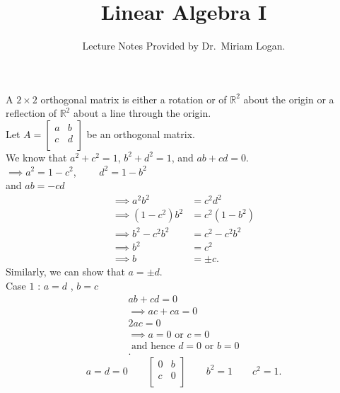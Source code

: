\documentclass{report}
\begin{document}
\title{Linear Algebra I}
\author{Lecture Notes Provided by Dr.~Miriam Logan.}
\date{}
\maketitle
\tableofcontents
\newpage  
   
A $  2 \times  2$ orthogonal matrix is either a rotation or of $ \mathbb{R} ^2$ about the origin or a reflection of $ \mathbb{R} ^2$ about a line through the origin.  \\
Let $ A = \begin{bmatrix}
a & b\\
c & d\\
\end{bmatrix}$ be an orthogonal matrix. \\
We know that $ a ^2 + c^2 =1$, $ b^2 + d^2 = 1$, and $ ab + cd = 0$. \\
$ \implies a^2 = 1- c^2$, $ \qquad  d^2 = 1 - b^2$\\
and $ ab = -cd $ \\
 \begin{align*}
   \implies a^2 b^2 &= c^2 d^2 \\
   \implies \left(1 - c^2\right)b^2 &= c^2 \left(1 - b^2\right)\\
   \implies b^2 - c^2 b^2 &= c^2 - c^2 b^2\\
   \implies b^2 &= c^2\\
   \implies b &= \pm c
 .\end{align*}
 Similarly, we can show that $ a = \pm d$. \\
 Case $ 1$ : $ a = d$ , $ b = c$
 \begin{align*}
  ab+cd =0\\
  \implies ac+ ca = 0\\
  2ac = 0\\
  \implies a = 0 \text{ or } c = 0\\
  \text{ and hence } d = 0 \text{ or } b = 0\\
 .\end{align*}
 \[
 a=d=0  \qquad  \begin{bmatrix}
 0 & b\\
 c & 0\\
 \end{bmatrix} \qquad  b^2=1 \qquad c^2=1
 .\] 
\end{document}
